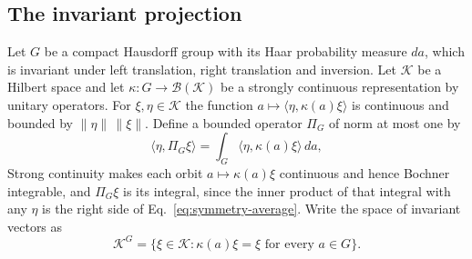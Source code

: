 \documentclass[11pt]{article}
\theoremstyle{definition}
\begin{document}
\subsection{The invariant projection}
\label{subsec:symmetry-projection}

Let $G$ be a compact Hausdorff group with its Haar probability measure $da$, which is invariant under left translation, right translation and inversion. Let $\mathcal K$ be a Hilbert space and let $\kappa:G\to\mathcal B(\mathcal K)$ be a strongly continuous representation by unitary operators. For $\xi,\eta\in\mathcal K$ the function $a\mapsto\langle\eta,\kappa(a)\xi\rangle$ is continuous and bounded by $\|\eta\|\,\|\xi\|$. Define a bounded operator $\Pi_G$ of norm at most one by
\begin{equation}
 \langle\eta,\Pi_G\xi\rangle=\int_G\langle\eta,\kappa(a)\xi\rangle\,da ,
 \label{eq:symmetry-average}
\end{equation}
Strong continuity makes each orbit $a\mapsto\kappa(a)\xi$ continuous and hence Bochner integrable, and $\Pi_G\xi$ is its integral, since the inner product of that integral with any $\eta$ is the right side of Eq.~\eqref{eq:symmetry-average}. Write the space of invariant vectors as
\begin{equation}
 \mathcal K^G=\{\xi\in\mathcal K:\kappa(a)\xi=\xi\text{ for every }a\in G\}.
 \label{eq:symmetry-invariant-space}
\end{equation}
\end{document}
